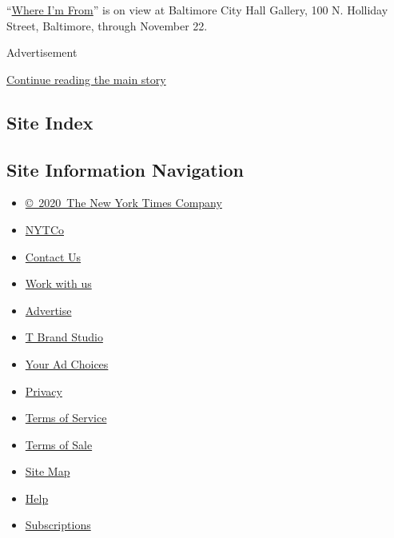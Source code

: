 ``\href{http://www.bmoreart.com/events/derrick-adams-where-im-from}{Where
I'm From}'' is on view at Baltimore City Hall Gallery, 100 N. Holliday
Street, Baltimore, through November 22.

Advertisement

\protect\hyperlink{after-bottom}{Continue reading the main story}

\hypertarget{site-index}{%
\subsection{Site Index}\label{site-index}}

\hypertarget{site-information-navigation}{%
\subsection{Site Information
Navigation}\label{site-information-navigation}}

\begin{itemize}
\tightlist
\item
  \href{https://help.nytimes3xbfgragh.onion/hc/en-us/articles/115014792127-Copyright-notice}{©~2020~The
  New York Times Company}
\end{itemize}

\begin{itemize}
\tightlist
\item
  \href{https://www.nytco.com/}{NYTCo}
\item
  \href{https://help.nytimes3xbfgragh.onion/hc/en-us/articles/115015385887-Contact-Us}{Contact
  Us}
\item
  \href{https://www.nytco.com/careers/}{Work with us}
\item
  \href{https://nytmediakit.com/}{Advertise}
\item
  \href{http://www.tbrandstudio.com/}{T Brand Studio}
\item
  \href{https://www.nytimes3xbfgragh.onion/privacy/cookie-policy\#how-do-i-manage-trackers}{Your
  Ad Choices}
\item
  \href{https://www.nytimes3xbfgragh.onion/privacy}{Privacy}
\item
  \href{https://help.nytimes3xbfgragh.onion/hc/en-us/articles/115014893428-Terms-of-service}{Terms
  of Service}
\item
  \href{https://help.nytimes3xbfgragh.onion/hc/en-us/articles/115014893968-Terms-of-sale}{Terms
  of Sale}
\item
  \href{https://spiderbites.nytimes3xbfgragh.onion}{Site Map}
\item
  \href{https://help.nytimes3xbfgragh.onion/hc/en-us}{Help}
\item
  \href{https://www.nytimes3xbfgragh.onion/subscription?campaignId=37WXW}{Subscriptions}
\end{itemize}
